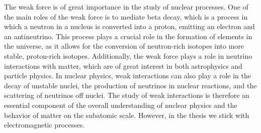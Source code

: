 


The weak force is of great importance in the study of nuclear processes. One of the main roles of the weak force is to mediate  beta decay,
which is a process in which a neutron in a nucleus is converted into a proton, emitting an electron and an antineutrino. This process plays
a crucial role in the formation of elements in the universe, as it allows for the conversion of neutron-rich isotopes into more stable,
proton-rich isotopes. Additionally, the weak force plays a role in neutrino interactions with matter, which are of great interest in both
astrophysics and particle physics. In nuclear physics, weak interactions can also play a role in the decay of unstable nuclei, the
production of neutrinos in nuclear reactions, and the scattering of neutrinos off nuclei. The study of weak interactions is therefore an
essential component of the overall understanding of nuclear physics and the behavior of matter on the subatomic scale.
However, in the thesis we stick with electromagnetic processes.


